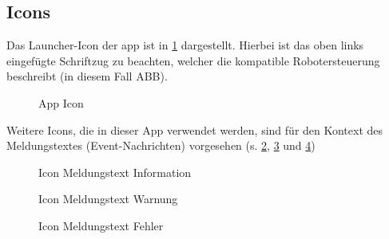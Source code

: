 \subsection{Icons}
Das Launcher-Icon der \gls{app} ist in \ref{fig:appIcon} dargestellt. Hierbei 
ist das oben links eingefügte Schriftzug zu beachten, welcher die kompatible 
Robotersteuerung beschreibt (in diesem Fall ABB).
\begin{figure}[H]
	\centering
	\caption[App Icon]{App Icon}
	\label{fig:appIcon}
\end{figure}

Weitere Icons, die in dieser App verwendet werden, sind für den Kontext des 
Meldungstextes (Event-Nachrichten) vorgesehen (s. \ref{fig:appInfo}, 
\ref{fig:appWarning} und \ref{fig:appError})

\begin{figure}[H]
	\centering
	\caption[Icon Meldungstext Information]{Icon Meldungstext Information}
	\label{fig:appInfo}
\end{figure}

\begin{figure}[H]
	\centering
	\caption[Icon Meldungstext Warnung]{Icon Meldungstext Warnung}
	\label{fig:appWarning}
\end{figure}

\begin{figure}[H]
	\centering
	\caption[Icon Meldungstext Fehler]{Icon Meldungstext Fehler}
	\label{fig:appError}
\end{figure}


